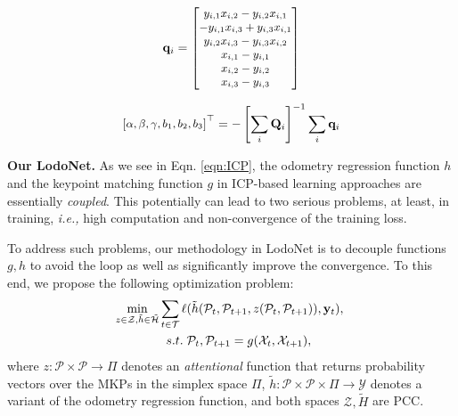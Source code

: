 \documentclass[sigconf]{acmart}
\def\ie{\emph{i.e., }}
\def\lodo{LodoNet}
\newcommand{\bfsection}[1]{\vspace*{0.1cm}\noindent\textbf{#1.}}
\begin{document}
\begin{align}
\small
    \mathbf{q}_i = 
    \begin{bmatrix}
        y_{i,1}x_{i,2} - y_{i,2}x_{i,1} \\
        -y_{i,1}x_{i,3} + y_{i,3}x_{i,1} \\
        y_{i,2}x_{i,3} - y_{i,3}x_{i,2} \\
        x_{i,1} - y_{i,1} \\
        x_{i,2} - y_{i,2} \\
        x_{i,3} - y_{i,3}
    \end{bmatrix}
\end{align}

\begin{align}
\small
    \begin{bmatrix}
        \alpha,
        \beta,
        \gamma,
        b_1,
        b_2,
        b_3
    \end{bmatrix}^\top=-\left[\sum_i\mathbf{Q}_i\right]^{-1}\sum_i\mathbf{q}_i
\end{align}


\bfsection{Our \lodo{}}
As we see in Eqn. \ref{eqn:ICP}, the odometry regression function $h$ and the keypoint matching function $g$ in ICP-based learning approaches are essentially {\em coupled}. This potentially can lead to two serious problems, at least, in training, \ie high computation and non-convergence of the training loss.

To address such problems, our methodology in \lodo{} is to decouple functions $g, h$ to avoid the loop as well as significantly improve the convergence. To this end, we propose the following optimization problem:
\begin{align}\label{eqn:lodonet}
\small
    \min_{z\in\mathcal{Z},  \Tilde{h}\in\tilde{\mathcal{H}}}  \sum_{t\in\mathcal{T}}\ell & (\tilde{h}(\mathcal{P}_{t},  \mathcal{P}_{t+1}, z(\mathcal{P}_{t}, \mathcal{P}_{t+1})), \mathbf{y}_{t}), \; \notag \\
    s.t. \;& \mathcal{P}_{t}, \mathcal{P}_{t+1} = g(\mathcal{X}_{t}, \mathcal{X}_{t+1}), 
\end{align}
where $z:\mathcal{P}\times\mathcal{P}\rightarrow\Pi$ denotes an {\em attentional} function that returns probability vectors over the MKPs in the simplex space $\Pi$, $\tilde{h}:\mathcal{P}\times\mathcal{P}\times\Pi\rightarrow\mathcal{Y}$ denotes a variant of the odometry regression function, and both spaces $\mathcal{Z}, \tilde{H}$ are PCC.
\end{document}
